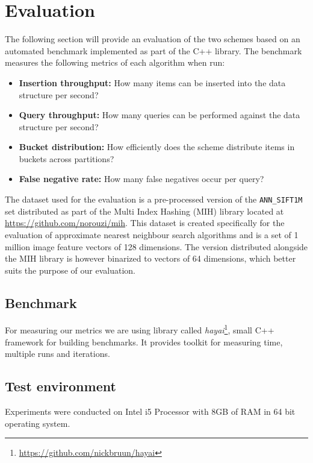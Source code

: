 \section{Evaluation}
\label{evaluation}

The following section will provide an evaluation of the two schemes based on an automated benchmark implemented as part of the C++ library. The benchmark measures the following metrics of each algorithm when run:

\begin{itemize}
  \item \textbf{Insertion throughput:} How many items can be inserted into the data structure per second?
  \item \textbf{Query throughput:} How many queries can be performed against the data structure per second?
  \item \textbf{Bucket distribution:} How efficiently does the scheme distribute items in buckets across partitions?
  \item \textbf{False negative rate:} How many false negatives occur per query?
\end{itemize}

The dataset used for the evaluation is a pre-processed version of the \texttt{ANN\_SIFT1M} set distributed as part of the Multi Index Hashing (MIH) library located at \url{https://github.com/norouzi/mih}. This dataset is created specifically for the evaluation of approximate nearest neighbour search algorithms and is a set of 1 million image feature vectors of 128 dimensions. The version distributed alongside the MIH library is however binarized to vectors of 64 dimensions, which better suits the purpose of our evaluation.

\subsection{Benchmark}

For measuring our metrics we are using library called \textit{hayai}\footnote{\url{https://github.com/nickbruun/hayai}}, small C++ framework for building benchmarks. It provides toolkit for measuring time, multiple runs and iterations.

\subsection{Test environment}

Experiments were conducted on Intel i5 Processor with 8GB of RAM in 64 bit operating system.

